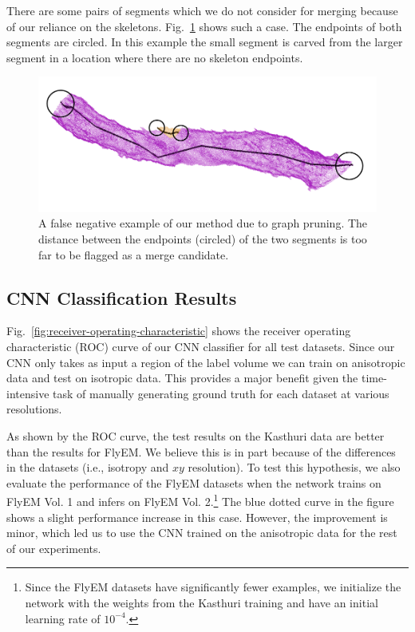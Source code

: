 There are some pairs of segments which we do not consider for merging because of our reliance on the skeletons. 
Fig.~\ref{fig:skeleton-results} shows such a case. 
The endpoints of both segments are circled.
In this example the small segment is carved from the larger segment in a location where there are no skeleton endpoints.

\begin{figure}[h!]
	\centering
	\includegraphics[width=0.85\linewidth]{./figures/merge_candidate1.png}
	\caption{A false negative example of our method due to graph pruning. The distance between the endpoints (circled) of the two segments is too far to be flagged as a merge candidate.}
	\label{fig:skeleton-results}
\end{figure}


\subsection{CNN Classification Results}

Fig.~\ref{fig:receiver-operating-characteristic} shows the receiver operating characteristic (ROC) curve of our CNN classifier for all test datasets.
Since our CNN only takes as input a region of the label volume we can train on  anisotropic data and test on isotropic data.
This provides a major benefit given the time-intensive task of manually generating ground truth for each dataset at various resolutions.

As shown by the ROC curve, the test results on the Kasthuri data are better than the results for FlyEM.
We believe this is in part because of the differences in the datasets (i.e., isotropy and $xy$ resolution).
To test this hypothesis, we also evaluate the performance of the FlyEM datasets when the network trains on FlyEM Vol. 1 and infers on FlyEM Vol. 2.\footnote{Since the FlyEM datasets have significantly fewer examples, we initialize the network with the weights from the Kasthuri training and have an initial learning rate of $10^{-4}$.}
The blue dotted curve in the figure shows a slight performance increase in this case. However, the improvement is minor, which led us to use the CNN trained on the anisotropic data for the rest of our experiments.

